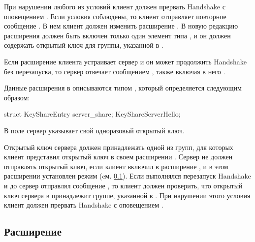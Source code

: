 При нарушении любого из условий клиент должен прервать Handshake с оповещением 
. 
%
Если условия соблюдены, то клиент отправляет повторное сообщение 
. В нем клиент должен изменить расширение
. В новую редакцию расширения должен быть включен только один 
элемент типа , и он должен содержать открытый ключ для 
группы, указанной в .

Если расширение  клиента устраивает сервер и он может 
продолжить Handshake без перезапуска, то сервер отвечает сообщением 
, также включая в него .

Данные расширения  в  
описываются типом , который определяется 
следующим образом: 

\begin{codeblock}
struct {
  KeyShareEntry server_share;
} KeyShareServerHello;
\end{codeblock}

В поле  сервер указывает свой одноразовый открытый ключ.

Открытый ключ сервера должен принадлежать одной из групп, для которых клиент 
представил открытый ключ в своем расширении .
%
%
Сервер не должен отправлять открытый ключ, если клиент включил в
 расширение
, и в этом расширении установлен
режим  (cм. \ref{HS.Ext.pkem}).
%
Если выполнялся перезапуск Handshake и до  сервер
отправлял сообщение , то клиент должен
проверить, что открытый ключ сервера в  принадлежит
группе, указанной в . При нарушении этого
условия клиент должен прервать Handshake с оповещением
.

\subsection{Расширение }\label{HS.Ext.pkem} 

